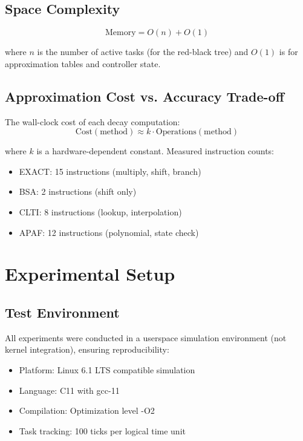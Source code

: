 \documentclass[conference]{IEEEtran}
\begin{document}
\subsection{Space Complexity}

\begin{equation}
\text{Memory} = O(n) + O(1)
\end{equation}

where $n$ is the number of active tasks (for the red-black tree) and $O(1)$ is for approximation tables and controller state.

\subsection{Approximation Cost vs. Accuracy Trade-off}

The wall-clock cost of each decay computation:
\begin{equation}
\text{Cost}(\text{method}) \approx k \cdot \text{Operations}(\text{method})
\label{eq:cost}
\end{equation}

where $k$ is a hardware-dependent constant. Measured instruction counts:
\begin{itemize}
\item EXACT: 15 instructions (multiply, shift, branch)
\item BSA: 2 instructions (shift only)
\item CLTI: 8 instructions (lookup, interpolation)
\item APAF: 12 instructions (polynomial, state check)
\end{itemize}

\section{Experimental Setup}\label{sec:experiments}

\subsection{Test Environment}

All experiments were conducted in a userspace simulation environment (not kernel integration), ensuring reproducibility:
\begin{itemize}
\item Platform: Linux 6.1 LTS compatible simulation
\item Language: C11 with gcc-11
\item Compilation: Optimization level -O2
\item Task tracking: 100 ticks per logical time unit
\end{itemize}
\end{document}
